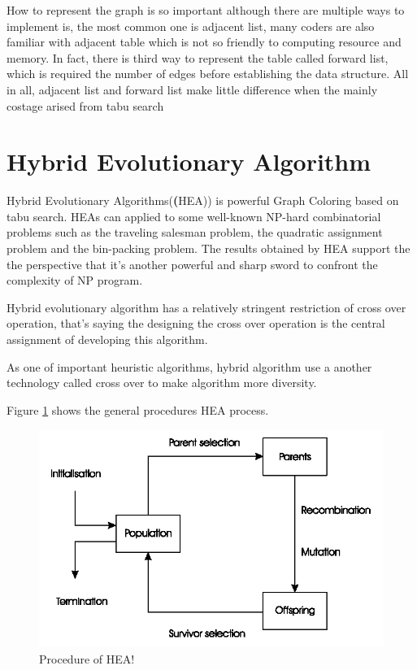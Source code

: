 \documentclass[10pt, a4paper, twocolumn]{article} %
\begin{document}
How to represent the graph is so important although there are multiple ways to
implement is, the most common one is adjacent list, many coders are also
familiar with adjacent table which is not so friendly to computing resource and
memory. In fact, there is third way to represent the table called forward list,
which is required the number of edges before establishing the data structure.
All in all, adjacent list and forward list make little difference when the
mainly costage arised from tabu search



\section{Hybrid Evolutionary Algorithm}
Hybrid Evolutionary Algorithms(\textbf(HEA)) is powerful Graph Coloring \citep{Galinier1999}
based on tabu search. HEAs can  applied to some well-known NP-hard combinatorial
problems such as the traveling salesman problem, the quadratic assignment
problem and the bin-packing problem.  The results obtained by HEA support the
the perspective that it's another powerful and sharp sword to confront the
complexity of NP program.

Hybrid evolutionary algorithm has a relatively stringent restriction of cross
over operation, that's saying the designing the cross over operation is the
central assignment of developing this algorithm.

As one of important heuristic algorithms, hybrid algorithm use a another
technology called cross over to make algorithm more diversity.

Figure \ref{heaone} shows the general procedures HEA process.

\begin{figure}
	\includegraphics[width=\linewidth]{HEAone.png} %
	\caption{Procedure of HEA!} %
	\label{heaone} %
\end{figure}
\end{document}
